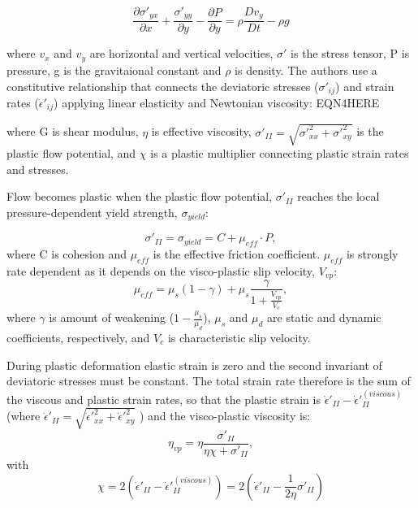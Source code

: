 \documentclass[draft,jgrga]{agutex}
\begin{document}
\begin{equation}
	\frac{\partial \sigma'_{yx}}{\partial x} + \frac{\sigma'_{yy}}{\partial y} - \frac{\partial P}{\partial y} = \rho\frac{Dv_y}{Dt} - \rho g
	\label{eqn:momentum}
\end{equation}
	
where $v_x$ and $v_y$ are horizontal and vertical velocities, $\sigma'$ is the stress tensor, P is pressure, g is the gravitaional constant and $\rho$ is density. The authors use a constitutive relationship that connects the deviatoric stresses ($\sigma'_{ij}$) and strain rates ($\dot{\epsilon}'_{ij}$) applying linear elasticity and Newtonian viscosity: EQN4HERE

	
where G is shear modulus, $\eta$ is effective viscosity, $\sigma'_{II} = \sqrt{\sigma'^2_{xx} + \sigma'^2_{xy}}$ is the plastic flow potential, and $\chi$ is a plastic multiplier connecting plastic strain rates and stresses.

Flow becomes plastic when the plastic flow potential, $\sigma'_{II}$ reaches the local pressure-dependent yield strength, $\sigma_{yield}$:

\begin{equation}
	 	\sigma'_{II} = \sigma_{yield} = C + \mu_{eff} \cdot P, 
 \end{equation} 
where C is cohesion and $\mu_{eff}$ is the effective friction coefficient. $\mu_{eff}$ is strongly rate dependent as it depends on the visco-plastic slip velocity, $V_{vp}$:
\begin{equation}
 	\mu_{eff} = \mu_s(1-\gamma) + \mu_s\frac{\gamma}{1 + \frac{V_{vp}}{V_c}},
 \end{equation} 
 where  $\gamma$ is amount of weakening ($1 - \frac{\mu_s}{\mu_d}$), $\mu_s$ and $\mu_d$ are static and dynamic coefficients, respectively, and $V_c$ is characteristic slip velocity. 

During plastic deformation elastic strain is zero and the second invariant of deviatoric stresses must be constant. The total strain rate therefore is the sum of the viscous and plastic strain rates, so that the plastic strain is $\dot{\epsilon}'_{II} - \dot{\epsilon}'^{(viscous)}_{II}$ (where $\dot{\epsilon}'_{II} = \sqrt{\dot{\epsilon}'^2_{xx} + \dot{\epsilon}'^2_{xy}}$ ) and the visco-plastic viscosity is:
\begin{equation}
 	\eta_{vp} = \eta\frac{\sigma'_{II}}{\eta\chi + \sigma'_{II}},
 \end{equation} 
with 
\begin{equation}
	\chi = 2(\dot{\epsilon}'_{II} - \dot{\epsilon}'^{(viscous)}_{II}) = 2(\dot{\epsilon}'_{II} - \frac{1}{2\eta}\sigma'_{II})
\end{equation}
\end{document}
